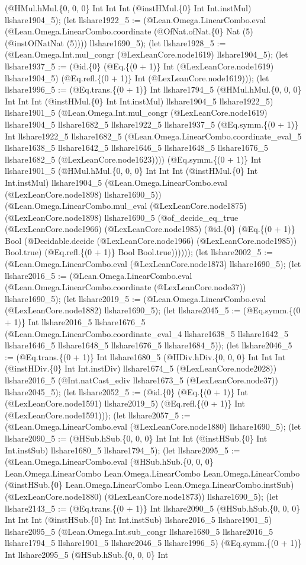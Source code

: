 \documentclass[11pt]{article}
\begin{document}
(@HMul.hMul.\{0, 0, 0\} Int Int Int (@instHMul.\{0\} Int Int.instMul) llshare1904\_5); (let llshare1922\_5 := (@Lean.Omega.LinearCombo.eval (@Lean.Omega.LinearCombo.coordinate (@OfNat.ofNat.\{0\} Nat (5) (@instOfNatNat (5)))) llshare1690\_5); (let llshare1928\_5 := (@Lean.Omega.Int.mul\_congr (@LexLeanCore.node1619) llshare1904\_5); (let llshare1937\_5 := (@id.\{0\} (@Eq.\{(0 + 1)\} Int (@LexLeanCore.node1619) llshare1904\_5) (@Eq.refl.\{(0 + 1)\} Int (@LexLeanCore.node1619))); (let llshare1996\_5 := (@Eq.trans.\{(0 + 1)\} Int llshare1794\_5 (@HMul.hMul.\{0, 0, 0\} Int Int Int (@instHMul.\{0\} Int Int.instMul) llshare1904\_5 llshare1922\_5) llshare1901\_5 (@Lean.Omega.Int.mul\_congr (@LexLeanCore.node1619) llshare1904\_5 llshare1682\_5 llshare1922\_5 llshare1937\_5 (@Eq.symm.\{(0 + 1)\} Int llshare1922\_5 llshare1682\_5 (@Lean.Omega.LinearCombo.coordinate\_eval\_5 llshare1638\_5 llshare1642\_5 llshare1646\_5 llshare1648\_5 llshare1676\_5 llshare1682\_5 (@LexLeanCore.node1623)))) (@Eq.symm.\{(0 + 1)\} Int llshare1901\_5 (@HMul.hMul.\{0, 0, 0\} Int Int Int (@instHMul.\{0\} Int Int.instMul) llshare1904\_5 (@Lean.Omega.LinearCombo.eval (@LexLeanCore.node1898) llshare1690\_5)) (@Lean.Omega.LinearCombo.mul\_eval (@LexLeanCore.node1875) (@LexLeanCore.node1898) llshare1690\_5 (@of\_decide\_eq\_true (@LexLeanCore.node1966) (@LexLeanCore.node1985) (@id.\{0\} (@Eq.\{(0 + 1)\} Bool (@Decidable.decide (@LexLeanCore.node1966) (@LexLeanCore.node1985)) Bool.true) (@Eq.refl.\{(0 + 1)\} Bool Bool.true)))))); (let llshare2002\_5 := (@Lean.Omega.LinearCombo.eval (@LexLeanCore.node1873) llshare1690\_5); (let llshare2016\_5 := (@Lean.Omega.LinearCombo.eval (@Lean.Omega.LinearCombo.coordinate (@LexLeanCore.node37)) llshare1690\_5); (let llshare2019\_5 := (@Lean.Omega.LinearCombo.eval (@LexLeanCore.node1882) llshare1690\_5); (let llshare2045\_5 := (@Eq.symm.\{(0 + 1)\} Int llshare2016\_5 llshare1676\_5 (@Lean.Omega.LinearCombo.coordinate\_eval\_4 llshare1638\_5 llshare1642\_5 llshare1646\_5 llshare1648\_5 llshare1676\_5 llshare1684\_5)); (let llshare2046\_5 := (@Eq.trans.\{(0 + 1)\} Int llshare1680\_5 (@HDiv.hDiv.\{0, 0, 0\} Int Int Int (@instHDiv.\{0\} Int Int.instDiv) llshare1674\_5 (@LexLeanCore.node2028)) llshare2016\_5 (@Int.natCast\_ediv llshare1673\_5 (@LexLeanCore.node37)) llshare2045\_5); (let llshare2052\_5 := (@id.\{0\} (@Eq.\{(0 + 1)\} Int (@LexLeanCore.node1591) llshare2019\_5) (@Eq.refl.\{(0 + 1)\} Int (@LexLeanCore.node1591))); (let llshare2057\_5 := (@Lean.Omega.LinearCombo.eval (@LexLeanCore.node1880) llshare1690\_5); (let llshare2090\_5 := (@HSub.hSub.\{0, 0, 0\} Int Int Int (@instHSub.\{0\} Int Int.instSub) llshare1680\_5 llshare1794\_5); (let llshare2095\_5 := (@Lean.Omega.LinearCombo.eval (@HSub.hSub.\{0, 0, 0\} Lean.Omega.LinearCombo Lean.Omega.LinearCombo Lean.Omega.LinearCombo (@instHSub.\{0\} Lean.Omega.LinearCombo Lean.Omega.LinearCombo.instSub) (@LexLeanCore.node1880) (@LexLeanCore.node1873)) llshare1690\_5); (let llshare2143\_5 := (@Eq.trans.\{(0 + 1)\} Int llshare2090\_5 (@HSub.hSub.\{0, 0, 0\} Int Int Int (@instHSub.\{0\} Int Int.instSub) llshare2016\_5 llshare1901\_5) llshare2095\_5 (@Lean.Omega.Int.sub\_congr llshare1680\_5 llshare2016\_5 llshare1794\_5 llshare1901\_5 llshare2046\_5 llshare1996\_5) (@Eq.symm.\{(0 + 1)\} Int llshare2095\_5 (@HSub.hSub.\{0, 0, 0\} Int 
\end{document}
